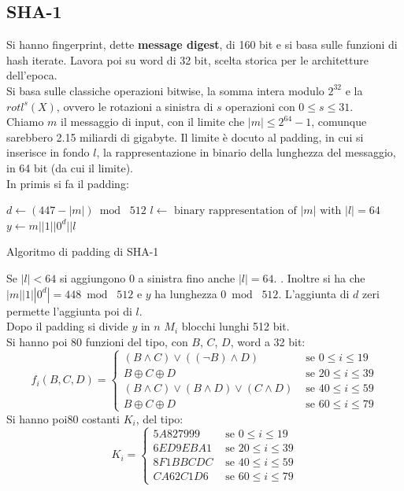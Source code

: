 \documentclass[a4paper,12pt, oneside]{book}
\begin{document}
\subsection{SHA-1}
Si hanno fingerprint, dette \textbf{message digest}, di 160 bit e si basa sulle
funzioni di hash iterate. Lavora poi su word di 32 bit, scelta storica per le
architetture dell'epoca.\\
Si basa sulle classiche operazioni bitwise, la somma intera modulo $2^{32}$ e la
$rotl^s(X)$, ovvero le rotazioni a sinistra di $s$ operazioni con $0\leq s \leq
31$.\\
Chiamo $m$ il messaggio di input, con il limite che $|m|\leq 2^{64}-1$, comunque
sarebbero 2.15 miliardi di gigabyte. Il limite è docuto al padding, in cui si
inserisce in fondo $l$, la rappresentazione in binario della lunghezza del
messaggio, in 64 bit (da cui il limite).\\
In primis si fa il padding:
\begin{algorithm}[H]
  \begin{algorithmic}
    \State $d\gets (447-|m|)\bmod\,\,512$
    \State $l\gets\mbox{ binary rappresentation of }|m|\mbox{ with }|l|=64$
    \State $y\gets m||1||0^d||l$
    \EndFunction
  \end{algorithmic}
  \caption{Algoritmo di padding di SHA-1}
\end{algorithm}
Se $|l|<64$ si aggiungono 0 a sinistra fino anche $|l|=64$.
. Inoltre si ha che
$|m||1||0^d|=448\bmod\,\,512$ e $y$ ha lunghezza $0\bmod\,\,512$. L'aggiunta di
$d$ zeri permette l'aggiunta poi di $l$.\\
Dopo il padding si divide $y$ in $n$ $M_i$ blocchi lunghi 512 bit.\\
Si hanno poi 80 funzioni del tipo, con $B$, $C$, $D$, word a 32 bit:
\[f_i(B,C,D)=
  \begin{cases}
    (B\land C)\lor ((\neg B)\land D)&\mbox{ se } 0\leq i\leq 19\\
    B\oplus C\oplus D&\mbox{ se } 20\leq i\leq 39\\
    (B\land C)\lor (B\land D)\lor (C\land D)&\mbox{ se } 40\leq i\leq 59\\
    B\oplus C\oplus D&\mbox{ se } 60\leq i\leq 79
  \end{cases}
\]
Si hanno poi80 costanti $K_i$, del tipo:
\[K_i=
  \begin{cases}
    5A827999&\mbox{ se } 0\leq i\leq 19\\
    6ED9EBA1&\mbox{ se } 20\leq i\leq 39\\
    8F1BBCDC&\mbox{ se } 40\leq i\leq 59\\
    CA62C1D6&\mbox{ se } 60\leq i\leq 79
  \end{cases}
\]
\end{document}
